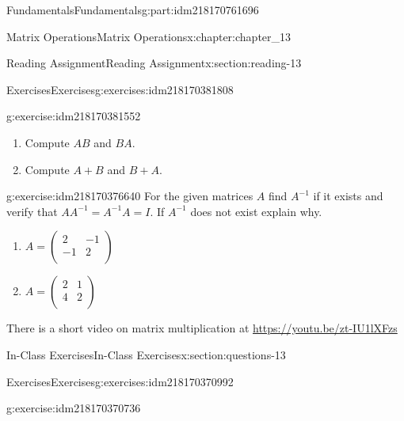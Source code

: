 \documentclass[oneside,10pt,]{book}
\numberwithin{equation}{section}
\begin{document}
\begin{partptx}{Fundamentals}{}{Fundamentals}{}{}{g:part:idm218170761696}
\begin{chapterptx}{Matrix Operations}{}{Matrix Operations}{}{}{x:chapter:chapter_13}
\begin{sectionptx}{Reading Assignment}{}{Reading Assignment}{}{}{x:section:reading-13}
\begin{exercises-subsection-numberless}{Exercises}{}{Exercises}{}{}{g:exercises:idm218170381808}
\begin{exercisegroup}
\begin{divisionexerciseeg}{1}{}{}{g:exercise:idm218170381552}
\begin{enumerate}[label=(\alph*)]
\item{}Compute \(A B\) and \(B A\).%
\item{}Compute \(A + B\) and \(B + A\).%
\end{enumerate}
%
\end{divisionexerciseeg}%
\begin{divisionexerciseeg}{2}{}{}{g:exercise:idm218170376640}%
For the given matrices \(A\) find \(A^{-1}\) if it exists and verify that \(A A^{-1}=A^{-1}A = I\). If \(A^{-1}\) does not exist explain why.%
\par
%
\begin{enumerate}[label=(\alph*)]
\item{}\(\displaystyle A =\left(
\begin{array}{cc}
2 & -1 \\
-1 & 2 \\
\end{array}
\right)\)%
\item{}\(\displaystyle A = \left(
\begin{array}{cc}
2 & 1 \\
4 & 2 \\
\end{array}
\right)\)%
\end{enumerate}
%
\end{divisionexerciseeg}%
\end{exercisegroup}
\par\medskip\noindent
\begin{conclusion}{}%
There is a short video on matrix multiplication at \url{https://youtu.be/zt-IU1lXFzs}%
\end{conclusion}%
\end{exercises-subsection-numberless}
\end{sectionptx}
%
%
\typeout{************************************************}
\typeout{************************************************}
%
\begin{sectionptx}{In-Class Exercises}{}{In-Class Exercises}{}{}{x:section:questions-13}
%
%
%
\typeout{************************************************}
\typeout{************************************************}
%
\begin{exercises-subsection-numberless}{Exercises}{}{Exercises}{}{}{g:exercises:idm218170370992}
\par\medskip\noindent%
%
\begin{exercisegroup}
\begin{divisionexerciseeg}{1}{}{}{g:exercise:idm218170370736}%

\end{divisionexerciseeg}
\end{exercisegroup}
\end{exercises-subsection-numberless}
\end{sectionptx}
\end{chapterptx}
\end{partptx}
\end{document}

